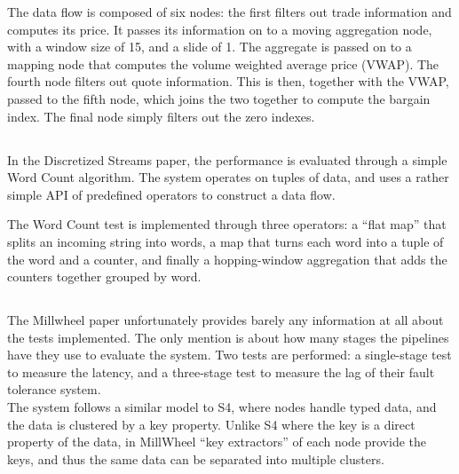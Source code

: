 
The data flow is composed of six nodes: the first filters out trade information and computes its price. It passes its information on to a moving aggregation node, with a window size of 15, and a slide of 1. The aggregate is passed on to a mapping node that computes the volume weighted average price (VWAP). The fourth node filters out quote information. This is then, together with the VWAP, passed to the fifth node, which joins the two together to compute the bargain index. The final node simply filters out the zero indexes.

\subsection{}
In the Discretized Streams paper, the performance is evaluated through a simple Word Count algorithm. The system operates on tuples of data, and uses a rather simple API of predefined operators to construct a data flow. \\


The Word Count test is implemented through three operators: a ``flat map'' that splits an incoming string into words, a map that turns each word into a tuple of the word and a counter, and finally a hopping-window aggregation that adds the counters together grouped by word.

\subsection{}
The Millwheel paper unfortunately provides barely any information at all about the tests implemented. The only mention is about how many stages the pipelines have they use to evaluate the system. Two tests are performed: a single-stage test to measure the latency, and a three-stage test to measure the lag of their fault tolerance system. \\

The system follows a similar model to S4, where nodes handle typed data, and the data is clustered by a key property. Unlike S4 where the key is a direct property of the data, in MillWheel ``key extractors'' of each node provide the keys, and thus the same data can be separated into multiple clusters.


